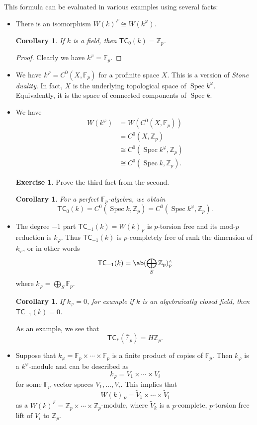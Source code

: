 \documentclass[10pt, oneside]{memoir}
\newtheorem{cor}[thm]{Corollary}
\theoremstyle{definition}
\newtheorem{exer}[thm]{Exercise}
\theoremstyle{remark}
\theoremstyle{plain}
\theoremstyle{definition}
\theoremstyle{remark}
\newcommand{\Z}{\mathbb{Z}}
\newcommand{\F}{\mathbb{F}}
\newcommand{\ms}[1]{\mathsf{#1}}
\newcommand{\ol}[1]{\overline{#1}}
\newcommand{\1}{\mathbf{1}}
\newcommand{\2}{\mathbf{2}}
\newcommand{\3}{\mathbf{3}}
\newcommand{\TC}{\ms{TC}}
\newcommand{\sw}{\mathsmaller{\wedge}}
\DeclareMathOperator{\Spec}{Spec}
\begin{document}
This formula can be evaluated in various examples using several facts:

\begin{itemize}
    \item There is an isomorphism \(W(k)^F \cong W(k^{\varphi}) \).
    \begin{cor}
        If \(k \) is a field, then \(\TC_0(k) = \Z_p \).
    \end{cor}
    
    \begin{proof}
        Clearly we have \(k^{\varphi} = \F_p \).
    \end{proof}
    \item We have \(k^{\varphi} = C^0(X, \F_p) \) for a profinite space \(X \). This is a version of \textit{Stone duality}. In fact, \(X \) is the underlying topological space of \(\Spec k^{\varphi} \). Equivalently, it is the space of connected components of \(\Spec k \).
    \item We have
    \begin{align*}
        W(k^{\varphi}) &= W(C^0(X, \F_p)) \\
        &= C^0(X, \Z_p) \\
        &\cong C^0(\Spec k^{\varphi}, \Z_p) \\
        &\cong C^0(\Spec k, \Z_p).
    \end{align*}
    \begin{exer}
        Prove the third fact from the second.
    \end{exer}
    \begin{cor}
        For a perfect \(\F_p \)-algebra, we obtain
        \[ \TC_0(k) = C^0(\Spec k, \Z_p) = C^0(\Spec k^{\varphi}, \Z_p). \]
    \end{cor}
    \item The degree \(-1 \) part \(\TC_{-1}(k) = W(k)_F \) is \(p \)-torsion free and its mod-\(p \) reduction is \(k_{\varphi} \). Thus \(\TC_{-1}(k) \) is \(p \)-completely free of rank the dimension of \(k_{\varphi} \), or in other words
    \[ \TC_{-1}(k) = \ab(\bigoplus_S \Z_p)_p^{\sw} \]
    where \(k_{\varphi} = \bigoplus_S \F_p \).
    \begin{cor}
        If \(k_{\varphi} = 0 \), for example if \(k \) is an algebraically closed field, then \(\TC_{-1}(k) = 0 \).
    \end{cor}
    As an example, we see that
    \[ \TC_*(\ol{\F}_p) = H\Z_p. \]
    \item Suppose that \(k_{\varphi} = \F_p \times \cdots \times \F_p \) is a finite product of copies of \(\F_p \). Then \(k_{\varphi} \) is a \(k^{\varphi} \)-module and can be described as
    \[ k_{\varphi} = V_1 \times \cdots \times V_i \]
    for some \(\F_p \)-vector spaces \(V_1, \ldots, V_i \). This implies that
    \[ W(k)_F = \tilde{V}_1 \times \cdots \times \tilde{V}_i \]
    as a \(W(k)^F = \Z_p \times \cdots \times \Z_p \)-module, where \(\tilde{V}_k \) is a \(p \)-complete, \(p \)-torsion free lift of \(V_i \) to \(\Z_p \).
\end{itemize}
\end{document}
